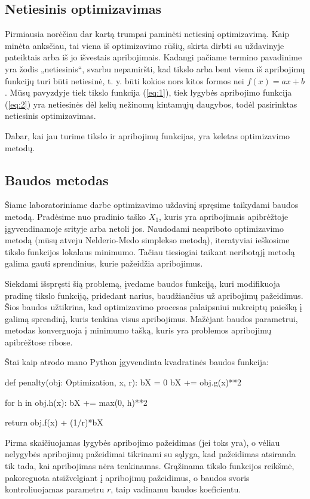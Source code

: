 \documentclass{article}
\begin{document}
\subsection{Netiesinis optimizavimas}
Pirmiausia norėčiau dar kartą trumpai paminėti netiesinį optimizavimą. Kaip minėta anksčiau, tai viena iš optimizavimo rūšių, skirta dirbti su uždavinyje pateiktais arba iš jo išvestais apribojimais. Kadangi pačiame termino pavadinime yra žodis „netiesinis“, svarbu nepamiršti, kad tikslo arba bent viena iš apribojimų funkcijų turi būti netiesinė, t. y. būti kokios nors kitos formos nei $f(x)=ax+b$. Mūsų pavyzdyje tiek tikslo funkcija (\ref{eq:1}), tiek lygybės apribojimo funkcija (\ref{eq:2}) yra netiesinės dėl kelių nežinomų kintamųjų daugybos, todėl pasirinktas netiesinis optimizavimas.

Dabar, kai jau turime tikslo ir apribojimų funkcijas, yra keletas optimizavimo metodų. 
\subsection{Baudos metodas}
Šiame laboratoriniame darbe optimizavimo uždavinį spręsime taikydami baudos metodą. Pradėsime nuo pradinio taško $X_{1}$, kuris yra apribojimais apibrėžtoje įgyvendinamoje srityje arba netoli jos. Naudodami neapriboto optimizavimo metodą (mūsų atveju Nelderio-Medo simplekso metodą), iteratyviai ieškosime tikslo funkcijos lokalaus minimumo. Tačiau tiesiogiai taikant neribotąjį metodą galima gauti sprendinius, kurie pažeidžia apribojimus.

Siekdami išspręsti šią problemą, įvedame baudos funkciją, kuri modifikuoja pradinę tikslo funkciją, pridedant narius, baudžiančius už apribojimų pažeidimus. Šios baudos užtikrina, kad optimizavimo procesas palaipsniui nukreiptų paiešką į galimą sprendinį, kuris tenkina visus apribojimus. Mažėjant baudos parametrui, metodas konverguoja į minimumo tašką, kuris yra problemos apribojimų apibrėžtose ribose.

Štai kaip atrodo mano Python įgyvendinta kvadratinės baudos funkcija:
\begin{python}
def penalty(obj: Optimization, x, r):
    bX = 0
    bX += obj.g(x)**2

    for h in obj.h(x):
        bX += max(0, h)**2

    return obj.f(x) + (1/r)*bX
\end{python}
Pirma skaičiuojamas lygybės apribojimo pažeidimas (jei toks yra), o vėliau nelygybės apribojimų pažeidimai tikrinami su sąlyga, kad pažeidimas atsiranda tik tada, kai apribojimas nėra tenkinamas. Grąžinama tikslo funkcijos reikšmė, pakoreguota atsižvelgiant į apribojimų pažeidimus, o baudos svoris kontroliuojamas parametru $r$, taip vadinamu baudos koeficientu.
\end{document}
